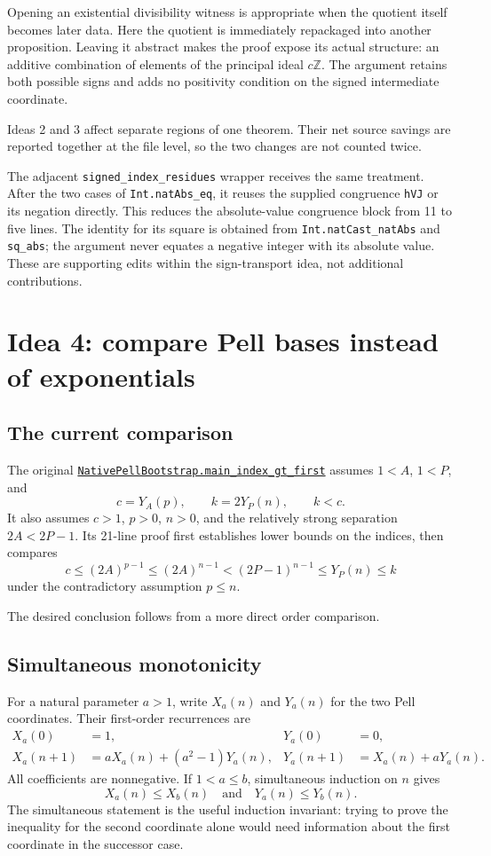 \documentclass[11pt,letterpaper]{article}
\newcommand{\code}[1]{\nolinkurl{#1}}
\newcommand{\repo}[2]{\href{https://github.com/VladimirReshetnikov/ProveIt/blob/b310142330df89e48413c8fce62e7de223e1c7d5/#1}{#2}}
\newcommand{\modulelink}[2]{\repo{Computability/DiophantineConsistency/Lean/DiophantineConsistency/#1.lean}{#2}}
\begin{document}
Opening an existential divisibility witness is appropriate when the quotient
itself becomes later data. Here the quotient is immediately repackaged into
another proposition. Leaving it abstract makes the proof expose its actual
structure: an additive combination of elements of the principal ideal
$c\mathbb Z$. The argument retains both possible signs and adds no positivity
condition on the signed intermediate coordinate.

Ideas 2 and 3 affect separate regions of one theorem. Their net source savings
are reported together at the file level, so the two changes are not counted
twice.

The adjacent \code{signed_index_residues} wrapper receives the same treatment.
After the two cases of \code{Int.natAbs_eq}, it reuses the supplied congruence
\code{hVJ} or its negation directly. This reduces the absolute-value congruence
block from 11 to five lines. The identity for its square is obtained from
\code{Int.natCast_natAbs} and \code{sq_abs}; the argument never equates a
negative integer with its absolute value. These are supporting edits within
the sign-transport idea, not additional contributions.

\section{Idea 4: compare Pell bases instead of exponentials}
\label{sec:pell-monotone}

\subsection{The current comparison}

The original
\modulelink{NativePellBootstrap}{\code{NativePellBootstrap.main_index_gt_first}}
assumes $1<A$, $1<P$, and
\[
 c=Y_A(p),\qquad k=2Y_P(n),\qquad k<c.
\]
It also assumes $c>1$, $p>0$, $n>0$, and the relatively strong separation
$2A<2P-1$. Its 21-line proof first establishes lower bounds on the indices,
then compares
\[
 c\le(2A)^{p-1}\le(2A)^{n-1}
 <(2P-1)^{n-1}\le Y_P(n)\le k
\]
under the contradictory assumption $p\le n$.

The desired conclusion follows from a more direct order comparison.

\subsection{Simultaneous monotonicity}

For a natural parameter $a>1$, write $X_a(n)$ and $Y_a(n)$ for the two Pell
coordinates. Their first-order recurrences are
\begin{align*}
 X_a(0)&=1,&Y_a(0)&=0,\\
 X_a(n+1)&=aX_a(n)+(a^2-1)Y_a(n),
 &Y_a(n+1)&=X_a(n)+aY_a(n).
\end{align*}
All coefficients are nonnegative. If $1<a\le b$, simultaneous induction on
$n$ gives
\[
 X_a(n)\le X_b(n)\quad\text{and}\quad Y_a(n)\le Y_b(n).
\]
The simultaneous statement is the useful induction invariant: trying to
prove the inequality for the second coordinate alone would need information
about the first coordinate in the successor case.
\end{document}
